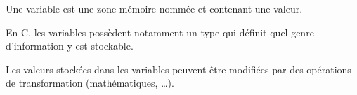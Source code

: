 \begin{frame}
  \frametitle{\secname}
  \framesubtitle{\subsecname} 

  Une variable est une zone mémoire nommée et contenant une valeur. 
  \vspace{0.5cm}
  \par
  En C, les variables possèdent notamment un type qui définit quel genre d'information y est stockable.
  \vspace{0.5cm}
  \par
  Les valeurs stockées dans les variables peuvent être modifiées par des opérations de transformation (mathématiques, \ldots).
\end{frame}

